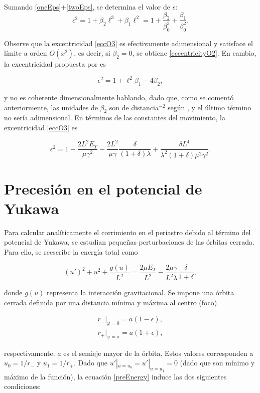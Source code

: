 \documentclass{article}
\begin{document}
Sumando \eqref{oneEps}+\eqref{twoEps}, se determina el valor de $\epsilon$:
\begin{equation}\label{eccO3}
	\boxed{\epsilon^2=1+\beta_2\ell^3+\beta_1\ell^2=1+\frac{\beta_2}{\beta_0^3}+\frac{\beta_1}{\beta_0^2}.}
\end{equation}

Observe que la excentricidad \eqref{eccO3} es efectivamente adimensional y satisface el límite a orden $O(x^2)$, es decir, si $\beta_{2}=0$, se obtiene \eqref{eccentricityO2}. En cambio, la excentricidad propuesta por \cite{Capozziello} es

$$\epsilon^2=1+\ell^{2} \beta_{1}-4 \beta_{2},$$

y no es coherente dimensionalmente hablando, dado que, como se comentó anteriormente, las unidades de $\beta_{2}$ son de distancia$^{-2}$ según \cite{Capozziello}, y el último término no sería adimensional. En términos de las constantes del movimiento, la excentricidad \eqref{eccO3} es

\begin{equation}
	\epsilon^2=1+\frac{2L^2E_T}{\mu\gamma^2}-\frac{2L^2}{\mu\gamma}\frac{\delta}{(1+\delta)\lambda}+\frac{\delta L^4}{\lambda^2(1+\delta)\mu^2\gamma^2}.
\end{equation}

\section{Precesión en el potencial de Yukawa}
Para calcular analíticamente el corrimiento en el periastro debido al término del potencial de Yukawa, se estudian pequeñas perturbaciones de las órbitas cerrada. Para ello, se reescribe la energía total como

\begin{equation}\label{preEnergy}
	(u')^2+u^2+\frac{g(u)}{L^2}=\frac{2\mu E_T}{L^2}-\frac{2\mu\gamma}{L^2\lambda}\frac{\delta}{1+\delta},
\end{equation}

donde $g(u)$ representa la interacción gravitacional. Se impone una órbita cerrada definida por una distancia mínima y máxima al centro (foco)

\begin{gather*}
	r_-|_{\varphi=0}=a(1-\epsilon),\\
	r_+|_{\varphi=\pi}=a(1+\epsilon),
\end{gather*}

respectivamente. $a$ es el semieje mayor de la órbita. Estos valores corresponden a $u_0=1/r_-$ y $u_1=1/r_+$. Dado que $u'|_{u=u_0}=u'|_{u=u_1}=0$ (dado que son mínimo y máximo de la función), la ecuación \eqref{preEnergy} induce las dos siguientes condiciones:
\end{document}
